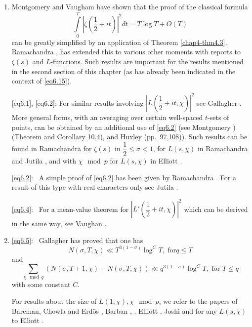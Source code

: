 \begin{enumerate}[{\bf 1.:}]
\item Montgomery and Vaugham \cite{key1} have shown that the proof of the
  classical formula 
\begin{equation*}
\int\limits^ T_0 |\zeta (\frac{1}{2} + it)|^2 dt = T \log T + O(T)
\tag{6.56}\label{eq6.56} 
\end{equation*}
can be greatly simplified by an application of Theorem
\ref{chap4-thm4.3}. Ramachandra \cite{key6}, \cite{key7} has extended
this to various other 
moments with reports to $\zeta (s)$ and $L$-functions. Such results are
important for the results mentioned in the second section of this
chapter (as has already been indicated in the context of \eqref{eq6.15}).  

\eqref{eq6.1}, \eqref{eq6.2}: For similar results involving
$|L(\dfrac{1}{2} + it, \chi)|^2$ see Gallagher
\cite{key8}. More general forms, with an averaging over certain
well-spaced $t$-sets of points, can be obtained by an additional use
of \eqref{eq6.2} (see Montgomery \cite{key5}) (Theorem and Corollary 10.4), and Huxley \cite{key7} (pp.~97,108)). Such
results can be found in Ramachandra \cite{key3} for $\zeta (s)$ in
$\dfrac{1}{2} \leq \sigma < 1$, for $L(s, \chi)$ in Ramachandra
\cite{key7} and Jutila \cite{key10}, and with $\chi \mod p$ for
$L(s, \chi)$ in Elliott \cite{key9}. 

\eqref{eq6.2}:~ A simple proof of \eqref{eq6.2} has been given by
Ramachandra \cite{key7}. For a result of this type with real
characters only see Jutila \cite{key7}. 

\eqref{eq6.4}:~ For a mean-value theorem for $|L' (\dfrac{1}{2} + it,
\chi)|^2$ which can be derived in the same way, see Vaughan
\cite{key6}. 

\item
\eqref{eq6.5}:~ Gallagher \cite{key8} has proved that one has 
\begin{equation*}
N(\sigma , T, \chi) \ll T^{3(1- \sigma)} \log ^C T, \text{ for
} q\leq T \tag{6.57}\label{eq6.57} 
\end{equation*}   
and 
\begin{equation*}
\sum_{\chi \mod q}(N(\sigma , T + 1, \chi)-N(\sigma , T,
\chi)) \ll q^{3(1- \sigma)} \log ^C T, \text{ for } T\leq q
\tag{6.58}\label{eq6.58} 
\end{equation*}   
with some constant $C$.
   
For results about the size of $L(1, \chi), \chi \mod p$,
we refer to the papers of Bareman, Chowla and Erd\"os \cite{key1}, Barban
\cite{key8}, \cite{key10}. Elliott \cite{key1}. Joshi \cite{key1} and
for any $L(s,\chi)$ to Elliott \cite{key8}.  


\end{enumerate}
